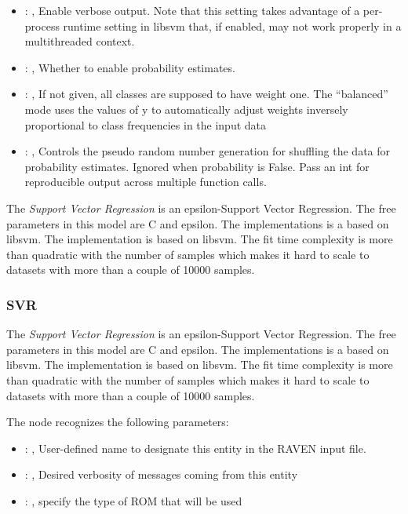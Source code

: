 \begin{itemize}
    \item {}: , 
      Enable verbose output. Note that this setting takes advantage
      of a per-process runtime setting in libsvm that, if enabled, may not
      work properly in a multithreaded context.

    \item {}: , 
      Whether to enable probability estimates.

    \item {}: \xmlDesc{[balanced]}, 
      If not given, all classes are supposed to have weight one.
      The “balanced” mode uses the values of y to automatically adjust weights
      inversely proportional to class frequencies in the input data

    \item {}: , 
      Controls the pseudo random number generation for shuffling
      the data for probability estimates. Ignored when probability is False.
      Pass an int for reproducible output across multiple function calls.
  \end{itemize}
 The  \textit{Support Vector Regression} is an epsilon-Support Vector Regression.
 The free parameters in this model are C and epsilon. The implementations is a based on libsvm.
 The implementation is based on libsvm. The fit time complexity                             is more
 than quadratic with the number of samples which makes it hard                             to scale
 to datasets with more than a couple of 10000 samples.

\subsubsection{SVR}
  The  \textit{Support Vector Regression} is an epsilon-Support Vector Regression.
  The free parameters in this model are C and epsilon. The implementations is a based on libsvm.
  The implementation is based on libsvm. The fit time complexity                             is more
  than quadratic with the number of samples which makes it hard                             to scale
  to datasets with more than a couple of 10000 samples.

  The  node recognizes the following parameters:
    \begin{itemize}
      \item {}: , 
        User-defined name to designate this entity in the RAVEN input file.
      \item {}: , 
        Desired verbosity of messages coming from this entity
      \item {}: , 
        specify the type of ROM that will be used
  \end{itemize}

